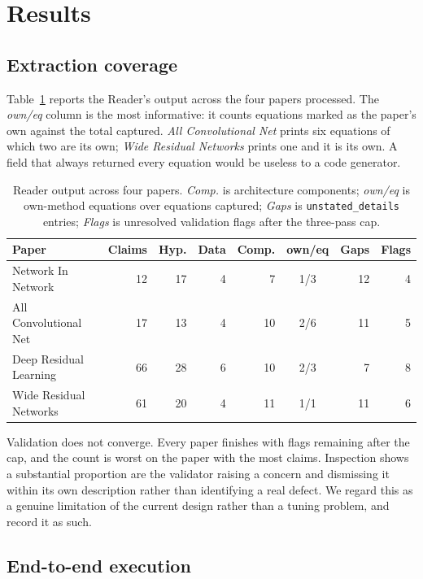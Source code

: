 \documentclass[10pt,twocolumn]{article}
\begin{document}
\section{Results}
\label{sec:results}

\subsection{Extraction coverage}

Table~\ref{tab:reader} reports the Reader's output across the four papers processed. The
\emph{own/eq} column is the most informative: it counts equations marked as the paper's
own against the total captured. \emph{All Convolutional Net} prints six equations of
which two are its own; \emph{Wide Residual Networks} prints one and it is its own. A
field that always returned every equation would be useless to a code generator.

\begin{table}[htbp]
\centering
\small
\caption{Reader output across four papers. \emph{Comp.} is architecture components;
\emph{own/eq} is own-method equations over equations captured; \emph{Gaps} is
\texttt{unstated\_details} entries; \emph{Flags} is unresolved validation flags after the
three-pass cap.}
\label{tab:reader}
\begin{tabular}{lrrrrcrr}
\toprule
Paper & Claims & Hyp. & Data & Comp. & own/eq & Gaps & Flags \\
\midrule
Network In Network      & 12 & 17 & 4 &  7 & 1/3 & 12 & 4 \\
All Convolutional Net   & 17 & 13 & 4 & 10 & 2/6 & 11 & 5 \\
Deep Residual Learning  & 66 & 28 & 6 & 10 & 2/3 &  7 & 8 \\
Wide Residual Networks  & 61 & 20 & 4 & 11 & 1/1 & 11 & 6 \\
\bottomrule
\end{tabular}
\end{table}

Validation does not converge. Every paper finishes with flags remaining after the cap,
and the count is worst on the paper with the most claims. Inspection shows a substantial
proportion are the validator raising a concern and dismissing it within its own
description rather than identifying a real defect. We regard this as a genuine limitation
of the current design rather than a tuning problem, and record it as such.

\subsection{End-to-end execution}
\end{document}
